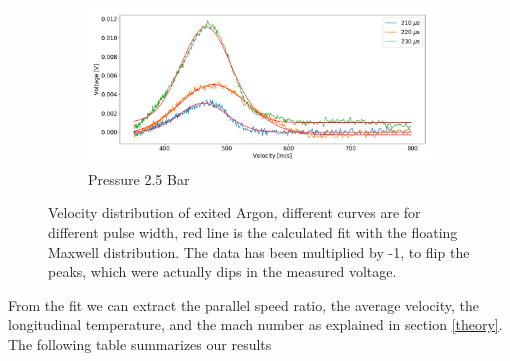 \documentclass[a4paper,10pt]{article}
\begin{document}
\begin{figure}[H]
  ~
  \begin{subfigure}[t]{0.49 \textwidth}
    \centering
    \includegraphics[width=\textwidth]{tof15}
    \caption{Pressure 2.5 Bar}\label{tof4}
  \end{subfigure}
  \caption{Velocity distribution of exited Argon, different curves are for different pulse width, red line is the calculated fit with the floating Maxwell distribution. The data has been multiplied by -1, to flip the peaks, which were actually dips in the measured voltage. }
  \label{tof}
\end{figure}
\newpage
From the fit we can extract the parallel speed ratio, the average velocity, the longitudinal temperature, and the mach number as explained in section \ref{theory}. The following table summarizes our results
\end{document}
